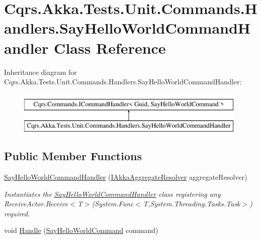 \hypertarget{classCqrs_1_1Akka_1_1Tests_1_1Unit_1_1Commands_1_1Handlers_1_1SayHelloWorldCommandHandler}{}\section{Cqrs.\+Akka.\+Tests.\+Unit.\+Commands.\+Handlers.\+Say\+Hello\+World\+Command\+Handler Class Reference}
\label{classCqrs_1_1Akka_1_1Tests_1_1Unit_1_1Commands_1_1Handlers_1_1SayHelloWorldCommandHandler}
Inheritance diagram for Cqrs.\+Akka.\+Tests.\+Unit.\+Commands.\+Handlers.\+Say\+Hello\+World\+Command\+Handler\+:\begin{figure}[H]
\begin{center}
\leavevmode
\includegraphics[height=2.000000cm]{classCqrs_1_1Akka_1_1Tests_1_1Unit_1_1Commands_1_1Handlers_1_1SayHelloWorldCommandHandler}
\end{center}
\end{figure}
\subsection*{Public Member Functions}
\begin{DoxyCompactItemize}
\item 
\hyperlink{classCqrs_1_1Akka_1_1Tests_1_1Unit_1_1Commands_1_1Handlers_1_1SayHelloWorldCommandHandler_a421fd9e6d3c9cbb5e93453675af63de0_a421fd9e6d3c9cbb5e93453675af63de0}{Say\+Hello\+World\+Command\+Handler} (\hyperlink{interfaceCqrs_1_1Akka_1_1Domain_1_1IAkkaAggregateResolver}{I\+Akka\+Aggregate\+Resolver} aggregate\+Resolver)
\begin{DoxyCompactList}\small\item\em Instantiates the \hyperlink{classCqrs_1_1Akka_1_1Tests_1_1Unit_1_1Commands_1_1Handlers_1_1SayHelloWorldCommandHandler}{Say\+Hello\+World\+Command\+Handler} class registering any Receive\+Actor.\+Receive$<$\+T$>$(\+System.\+Func$<$\+T,\+System.\+Threading.\+Tasks.\+Task$>$) required. \end{DoxyCompactList}\item 
void \hyperlink{classCqrs_1_1Akka_1_1Tests_1_1Unit_1_1Commands_1_1Handlers_1_1SayHelloWorldCommandHandler_a204e1dacbacfb172a47d1585b76ef1f4_a204e1dacbacfb172a47d1585b76ef1f4}{Handle} (\hyperlink{classCqrs_1_1Akka_1_1Tests_1_1Unit_1_1Commands_1_1SayHelloWorldCommand}{Say\+Hello\+World\+Command} command)
\end{DoxyCompactItemize}
